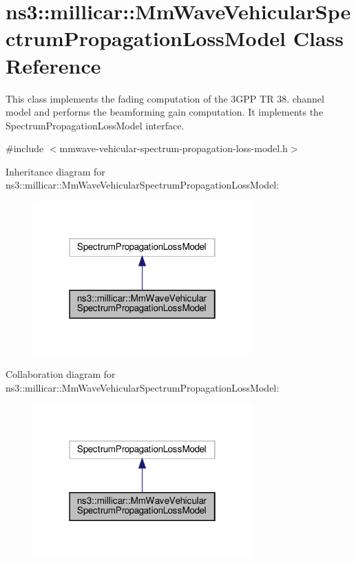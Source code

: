 \hypertarget{classns3_1_1millicar_1_1MmWaveVehicularSpectrumPropagationLossModel}{}\section{ns3\+:\+:millicar\+:\+:Mm\+Wave\+Vehicular\+Spectrum\+Propagation\+Loss\+Model Class Reference}
\label{classns3_1_1millicar_1_1MmWaveVehicularSpectrumPropagationLossModel}


This class implements the fading computation of the 3\+G\+PP TR 38. channel model and performs the beamforming gain computation. It implements the Spectrum\+Propagation\+Loss\+Model interface.  




{\ttfamily \#include $<$mmwave-\/vehicular-\/spectrum-\/propagation-\/loss-\/model.\+h$>$}



Inheritance diagram for ns3\+:\+:millicar\+:\+:Mm\+Wave\+Vehicular\+Spectrum\+Propagation\+Loss\+Model\+:
\nopagebreak
\begin{figure}[H]
\begin{center}
\leavevmode
\includegraphics[width=238pt]{classns3_1_1millicar_1_1MmWaveVehicularSpectrumPropagationLossModel__inherit__graph}
\end{center}
\end{figure}


Collaboration diagram for ns3\+:\+:millicar\+:\+:Mm\+Wave\+Vehicular\+Spectrum\+Propagation\+Loss\+Model\+:
\nopagebreak
\begin{figure}[H]
\begin{center}
\leavevmode
\includegraphics[width=238pt]{classns3_1_1millicar_1_1MmWaveVehicularSpectrumPropagationLossModel__coll__graph}
\end{center}
\end{figure}
